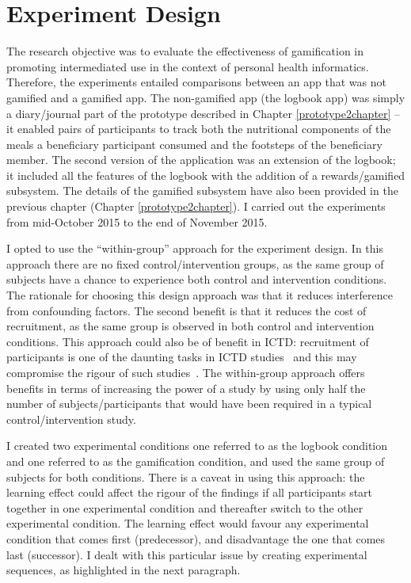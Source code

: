 \section{Experiment Design}\label{exp_design}
The research objective was to evaluate the effectiveness of gamification in promoting intermediated use in the context of personal health informatics. Therefore, the experiments entailed comparisons between an app that was not gamified and a gamified app. The non-gamified app (the logbook app) was simply a diary/journal part of the prototype described in Chapter \ref{prototype2chapter} -- it enabled pairs of participants to track both the nutritional components of the meals a beneficiary participant consumed and the footsteps of the beneficiary member. The second version of the application was an extension of the logbook; it included all the features of the logbook with the addition of a rewards/gamified subsystem. The details of the gamified subsystem have also been provided in the previous chapter (Chapter \ref{prototype2chapter}). I carried out the experiments from mid-October 2015 to the end of November 2015.

I opted to use the ``within-group'' approach for the experiment design. In this approach there are no fixed control/intervention groups, as the same group of subjects have a chance to experience both control and intervention conditions. The rationale for choosing this design approach was that it reduces interference from confounding factors. The second benefit is that it reduces the cost of recruitment, as the same group is observed in both control and intervention conditions. This approach could also be of benefit in ICTD: recruitment of participants is one of the daunting tasks in ICTD studies~\citep{anokwa2009stories,ramachandran2010research} and this may compromise the rigour of such studies~\citep{ramachandran2010research}. The within-group approach offers benefits in terms of increasing the power of a study by using only half the number of subjects/participants that would have been required in a typical control/intervention study.

I created two experimental conditions one referred to as the logbook condition and one referred to as the gamification condition, and used the same group of subjects for both conditions. There is a caveat in using this approach: the learning effect could affect the rigour of the findings  if all participants start together in one experimental condition and thereafter switch to the other experimental condition. The learning effect would favour any experimental condition that comes first (predecessor), and disadvantage the one that comes last (successor). I dealt with this particular issue by creating experimental sequences, as highlighted in the next paragraph. 

